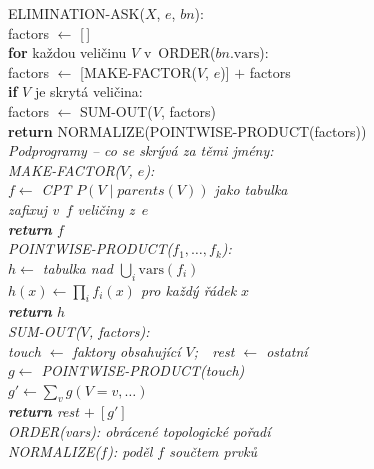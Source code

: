 \begin{algo}
\ttfamily\small
ELIMINATION-ASK($X$, $e$, $bn$):\\
\hspace*{1.5em}factors $\leftarrow$ [\,]\\
\hspace*{1.5em}\textbf{for} každou veličinu $V$ v~ORDER($bn.\mathrm{vars}$):\\
\hspace*{3em}factors $\leftarrow$ [MAKE-FACTOR($V$, $e$)] $+$ factors \\
\hspace*{3em}\textbf{if} $V$ je skrytá veličina:\\
\hspace*{4.5em}factors $\leftarrow$ SUM-OUT($V$, factors) \\
\hspace*{1.5em}\textbf{return} NORMALIZE(POINTWISE-PRODUCT(factors))\\[5pt]
\normalfont\itshape\footnotesize\textcolor{black!60}{Podprogramy -- co se skrývá za těmi jmény:}\\[3pt]
\ttfamily\small
MAKE-FACTOR($V$, $e$):\\
\hspace*{1.5em}$f \leftarrow$ CPT $P(V \mid \mathit{parents}(V))$ jako tabulka\\
\hspace*{1.5em}zafixuj v~$f$ veličiny z~$e$ \\
\hspace*{1.5em}\textbf{return} $f$\\[4pt]
POINTWISE-PRODUCT($f_1,\dots,f_k$):\\
\hspace*{1.5em}$h \leftarrow$ tabulka nad $\bigcup_i \mathrm{vars}(f_i)$\\
\hspace*{1.5em}$h(x) \leftarrow \prod_i f_i(x)$ pro každý řádek $x$ \\
\hspace*{1.5em}\textbf{return} $h$\\[4pt]
SUM-OUT($V$, factors):\\
\hspace*{1.5em}touch $\leftarrow$ faktory obsahující $V$;\ \ rest $\leftarrow$ ostatní\\
\hspace*{1.5em}$g \leftarrow$ POINTWISE-PRODUCT(touch) \\
\hspace*{1.5em}$g' \leftarrow \sum_{v} g(V{=}v,\dots)$ \\
\hspace*{1.5em}\textbf{return} rest $+\ [g']$\\[4pt]
ORDER(vars): obrácené topologické pořadí \\
NORMALIZE($f$): poděl $f$ součtem prvků 
\end{algo}

